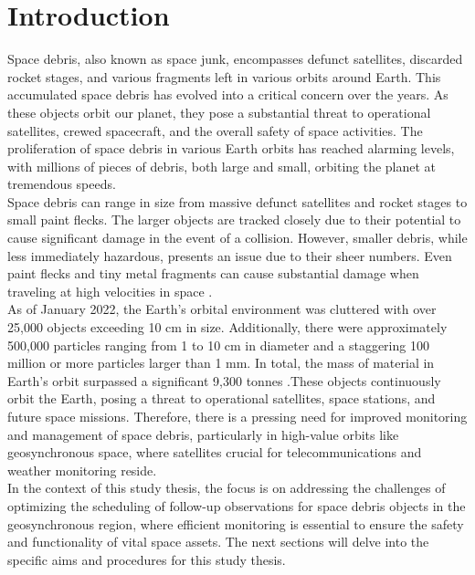 \chapter{Introduction}

Space debris, also known as space junk, encompasses defunct satellites, discarded rocket stages,
 and various fragments left in various orbits around Earth. This accumulated space debris has evolved
  into a critical concern over the years. As these objects orbit our planet, they pose a substantial 
  threat to operational satellites, crewed spacecraft, and the overall safety of space activities. 
  The proliferation of space debris in various Earth orbits has reached alarming levels, with millions of 
  pieces of debris, both large and small, orbiting the planet at tremendous speeds.\\

Space debris can range in size from massive defunct satellites and rocket stages to small paint flecks. 
The larger objects are tracked closely due to their potential to cause significant damage in the event of 
a collision. However, smaller debris, while less immediately hazardous, presents an issue due to their sheer 
numbers. Even paint flecks and tiny metal fragments can cause substantial damage when traveling at high 
velocities in space \cite{dev}.\\

As of January 2022, the Earth's orbital environment was cluttered with over 25,000 objects exceeding 10 cm in size. 
Additionally, there were approximately 500,000 particles ranging from 1 to 10 cm in diameter and a staggering 100 million 
or more particles larger than 1 mm. In total, the mass of material in Earth's orbit surpassed a significant 9,300 tonnes \cite{esa5}.These objects continuously orbit the Earth, posing a threat to operational satellites, space stations, 
and future space missions. Therefore, there is a pressing need for improved monitoring and management of space debris, 
particularly in high-value orbits like geosynchronous space, where satellites crucial for telecommunications and weather monitoring reside.\\ 

In the context of this study thesis, the focus is on addressing the challenges of optimizing the scheduling of follow-up observations for space debris objects in the geosynchronous region, where efficient monitoring is essential to ensure the safety and functionality of vital space assets. The next sections will delve into the specific aims and procedures for this study thesis.

